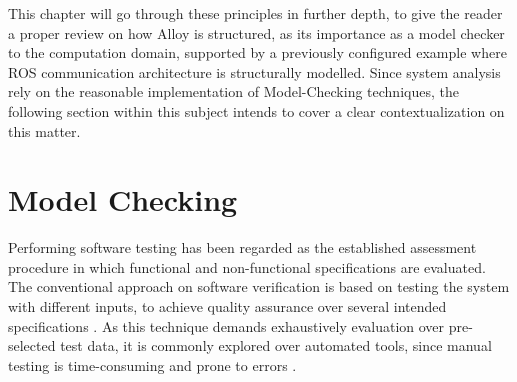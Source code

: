 This chapter will go through these principles in further depth, to give the reader a proper review on how Alloy is structured, as its importance as a model checker to the computation domain, supported by a previously configured example where ROS communication architecture is structurally modelled. Since system analysis rely on the reasonable implementation of Model-Checking techniques, the following section within this subject intends to cover a clear contextualization on this matter. %

\section{Model Checking}


Performing software testing has been regarded as the established assessment procedure in which functional and non-functional specifications are evaluated. The conventional approach on software verification is based on testing the system with different inputs, to achieve quality assurance over several intended specifications \cite{beyer2017software, briand2001uml}. As this technique demands exhaustively evaluation over pre-selected test data, it is commonly explored over automated tools, since manual testing is time-consuming and prone to errors \cite{clarke1976program, fraser2009testing}.


